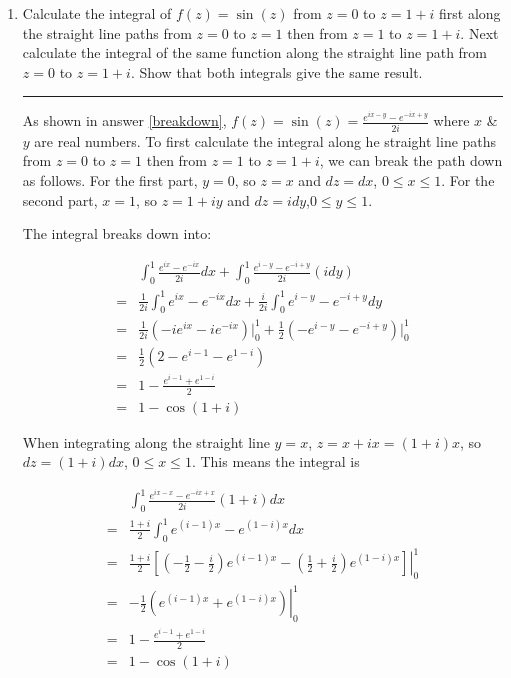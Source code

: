 \documentclass[12pt, oneside]{article}
\newenvironment{answer}
  {\vspace*{0.2cm} \rule{12cm}{0.02cm} \vspace*{0.2cm}}
  {\vspace*{0.2cm}}
\begin{document}
\begin{enumerate}
  \item Calculate the integral of $f(z) = \sin(z)$ from $z=0$ to $z=1 + i$ first along the straight line paths from $z = 0$ to $z = 1$ then from $z = 1$ to $z = 1 + i$. Next calculate the integral of the same function along the straight line path from $z = 0$ to $z = 1 + i$. Show that both integrals give the same result.

  \begin{answer}

    As shown in answer \ref{breakdown}, $f(z) = \sin(z) = \frac{e^{ix-y}-e^{-ix+y}}{2i}$ where $x$ \& $y$ are real numbers. To first calculate the integral along he straight line paths from $z = 0$ to $z = 1$ then from $z = 1$ to $z = 1 + i$, we can break the path down as follows.
    For the first part, $y=0$, so $z=x$ and $dz = dx$, $0\leq x \leq 1$. For the second   part, $x=1$, so $z = 1 + iy$ and $dz = idy$,$0\leq y \leq 1$.

    The integral breaks down into:

    \begin{align*}
      &\int_0^1 \frac{e^{ix}-e^{-ix}}{2i} dx+ \int_0^1 \frac{e^{i-y}-e^{-i+y}}{2i}(idy)\\
      =&\frac{1}{2i}\int_0^1 e^{ix}-e^{-ix} dx+ \frac{i}{2i} \int_0^1 e^{i-y}-e^{-i+y}dy\\
      =&\frac{1}{2i}(-ie^{ix}-ie^{-ix})\Big|_0^{1}+ \frac{1}{2} (-e^{i-y}-e^{-i+y})\Big|_0^{1}\\
      =&\frac{1}{2}(2-e^{i-1}-e^{1-i})\\
      =&1-\frac{e^{i-1}+e^{1-i}}{2}\\
      =&1-\cos(1+i)
    \end{align*}

    When integrating along the straight line $y=x$, $z=x+ix=(1+i)x$, so $dz=(1+i)dx$, $0\leq x \leq 1$. This means the integral is

    \begin{align*}
      &\int_0^{1} \frac{e^{ix-x}-e^{-ix+x}}{2i} (1+i)dx\\
      =&\frac{1+i}{2}\int_0^{1} e^{(i-1)x}-e^{(1-i)x}dx\\
      =&\left.\frac{1+i}{2}\left[\left(-\frac{1}{2}-\frac{i}{2}\right) e^{(i-1)x}-\left(\frac{1}{2}+\frac{i}{2}\right)e^{(1-i)x}\right]\right|_0^{1}\\
      =&\left.-\frac{1}{2}\left(e^{(i-1)x}+e^{(1-i)x}\right)\right|_0^{1}\\
      =&1-\frac{e^{i-1}+e^{1-i}}{2}\\
      =&1-\cos(1+i)
    \end{align*}

  \end{answer}
\end{enumerate}
\end{document}

